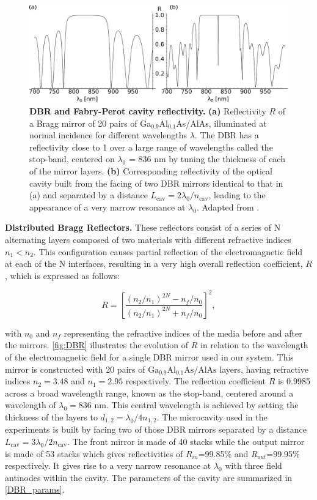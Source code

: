 \begin{figure}[h]
    \centering
    \includegraphics[width=1\linewidth]{chap_theory/fig/DBR.pdf}
    \caption{\textbf{DBR and Fabry-Perot cavity reflectivity.} \textbf{(a)} Reflectivity $R$ of a Bragg mirror of 20 pairs of Ga$_{0.9}$Al$_{0.1}$As/AlAs, illuminated at normal incidence for different wavelengths $\lambda$. The DBR has a reflectivity close to 1 over a large range of wavelengths called the stop-band, centered on $\lambda_0$ = 836 nm by tuning the thickness of each of the mirror layers. \textbf{(b)} Corresponding reflectivity of the optical cavity built from the facing of two DBR mirrors identical to that in (a) and separated by a distance $L_{\mathrm{cav}} = 2\lambda_0 / n_{\mathrm{cav}}$, leading to the appearance of a very narrow resonance at $\lambda_0$. Adapted from \cite{claude_phd}.}
    \label{fig:DBR}
\end{figure}

\textbf{Distributed Bragg Reflectors.} These reflectors consist of a series of N alternating layers composed of two materials with different refractive indices $n_1<n_2$. This configuration causes partial reflection of the electromagnetic field at each of the N interfaces, resulting in a very high overall reflection coefficient, $R$, which is expressed as follows:

\begin{equation}
    R = \left[  \dfrac{(n_2/n_1)^{2N} - n_f/n_0}{(n_2/n_1)^{2N} + n_f/n_0} \right]^2,
\end{equation}

with $n_0$ and $n_f$ representing the refractive indices of the media before and after the mirrors. \autoref{fig:DBR} illustrates the evolution of $R$ in relation to the wavelength of the electromagnetic field for a single DBR mirror used in our system. This mirror is constructed with 20 pairs of $\text{Ga}_{0.9}\text{Al}_{0.1}\text{As}/\text{AlAs}$ layers, having refractive indices $n_2 = 3.48$ and $n_1 = 2.95$ respectively. The reflection coefficient $R$ is 0.9985 across a broad wavelength range, known as the stop-band, centered around a wavelength of $\lambda_0 = 836$ nm. This central wavelength is achieved by setting the thickness of the layers to $d_{1,2} = \lambda_0 / 4n_{1,2}$. The microcavity used in the experiments is built by facing two of those DBR mirrors separated by a distance $L_{\mathrm{cav}}=3\lambda_0/2n_{\mathrm{cav}}$. The front mirror is made of 40 stacks while the output mirror is made of 53 stacks which gives reflectivities of $R_{in}$=99.85\% and $R_{out}$=99.95\% respectively. It gives rise to a very narrow resonance at $\lambda_0$ with three field antinodes within the cavity. The parameters of the cavity are summarized in \autoref{DBR_params}.

